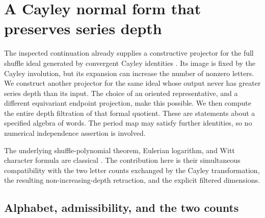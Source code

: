 \documentclass[11pt,a4paper]{article}
\numberwithin{equation}{section}
\theoremstyle{definition}
\theoremstyle{remark}
\begin{document}
\section{A Cayley normal form that preserves series depth}
\label{depthcay:sec}

The inspected continuation already supplies a constructive projector for
 the full shuffle ideal generated by convergent Cayley identities
\cite{depth:PriorProjection}. Its image is fixed by the Cayley involution,
but its expansion can increase the number of nonzero letters. We construct
another projector for the same ideal whose output never has greater
series depth than its input. The choice of an oriented representative,
and a different equivariant endpoint projection, make this possible.
We then compute the entire depth filtration of that formal quotient.
These are statements about a specified algebra of words. The period map
may satisfy further identities, so no numerical independence assertion is
involved.

The underlying shuffle-polynomial theorem, Eulerian logarithm, and Witt
character formula are classical \cite{depth:Radford,depth:Patras,depth:Reutenauer}.
The contribution here is their simultaneous compatibility with the two
letter counts exchanged by the Cayley transformation, the resulting
non-increasing-depth retraction, and the explicit filtered dimensions.

\subsection{Alphabet, admissibility, and the two counts}
\end{document}
